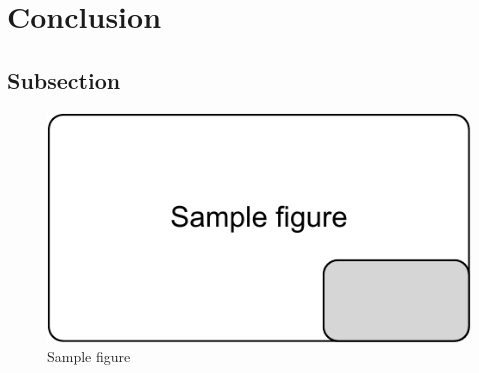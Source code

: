 \documentclass[10pt,sigconf]{acmart}
\begin{document}
\section{Conclusion}

\subsection{Subsection}


\begin{figure}[htbp]
  \centering
  \includegraphics[scale=0.5]{sample-figure}
  \caption{Sample figure}
  \label{fig:sample}
\end{figure}





 
\end{document}
